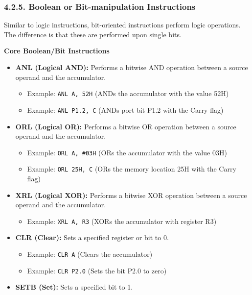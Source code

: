 \documentclass[
]{article}
\begin{document}
\hypertarget{425-boolean-or-bit-manipulation-instructions}{%
\subsubsection{4.2.5. Boolean or Bit-manipulation
Instructions}\label{425-boolean-or-bit-manipulation-instructions}}

Similar to logic instructions, bit-oriented instructions perform logic
operations. The difference is that these are performed upon single bits.

\textbf{Core Boolean/Bit Instructions}

\begin{itemize}
\item
  \textbf{ANL (Logical AND):} Performs a bitwise AND operation between a
  source operand and the accumulator.

  \begin{itemize}
  \item
    Example: \texttt{ANL\ A,\ 52H} (ANDs the accumulator with the value
    52H)
  \item
    Example: \texttt{ANL\ P1.2,\ C} (ANDs port bit P1.2 with the Carry
    flag)
  \end{itemize}
\item
  \textbf{ORL (Logical OR):} Performs a bitwise OR operation between a
  source operand and the accumulator.

  \begin{itemize}
  \item
    Example: \texttt{ORL\ A,\ \#03H} (ORs the accumulator with the value
    03H)
  \item
    Example: \texttt{ORL\ 25H,\ C} (ORs the memory location 25H with the
    Carry flag)
  \end{itemize}
\item
  \textbf{XRL (Logical XOR):} Performs a bitwise XOR operation between a
  source operand and the accumulator.

  \begin{itemize}
  \item
    Example: \texttt{XRL\ A,\ R3} (XORs the accumulator with register
    R3)
  \end{itemize}
\item
  \textbf{CLR (Clear):} Sets a specified register or bit to 0.

  \begin{itemize}
  \item
    Example: \texttt{CLR\ A} (Clears the accumulator)
  \item
    Example: \texttt{CLR\ P2.0} (Sets the bit P2.0 to zero)
  \end{itemize}
\item
  \textbf{SETB (Set):} Sets a specified bit to 1.


\end{itemize}
\end{document}
